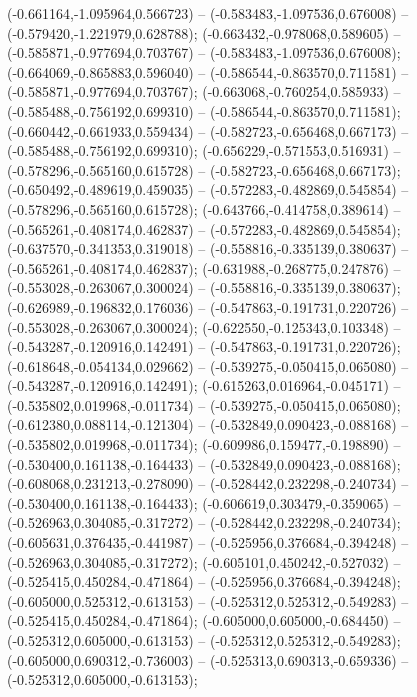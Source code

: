  (-0.661164,-1.095964,0.566723) -- (-0.583483,-1.097536,0.676008) -- (-0.579420,-1.221979,0.628788);
 (-0.663432,-0.978068,0.589605) -- (-0.585871,-0.977694,0.703767) -- (-0.583483,-1.097536,0.676008);
 (-0.664069,-0.865883,0.596040) -- (-0.586544,-0.863570,0.711581) -- (-0.585871,-0.977694,0.703767);
 (-0.663068,-0.760254,0.585933) -- (-0.585488,-0.756192,0.699310) -- (-0.586544,-0.863570,0.711581);
 (-0.660442,-0.661933,0.559434) -- (-0.582723,-0.656468,0.667173) -- (-0.585488,-0.756192,0.699310);
 (-0.656229,-0.571553,0.516931) -- (-0.578296,-0.565160,0.615728) -- (-0.582723,-0.656468,0.667173);
 (-0.650492,-0.489619,0.459035) -- (-0.572283,-0.482869,0.545854) -- (-0.578296,-0.565160,0.615728);
 (-0.643766,-0.414758,0.389614) -- (-0.565261,-0.408174,0.462837) -- (-0.572283,-0.482869,0.545854);
 (-0.637570,-0.341353,0.319018) -- (-0.558816,-0.335139,0.380637) -- (-0.565261,-0.408174,0.462837);
 (-0.631988,-0.268775,0.247876) -- (-0.553028,-0.263067,0.300024) -- (-0.558816,-0.335139,0.380637);
 (-0.626989,-0.196832,0.176036) -- (-0.547863,-0.191731,0.220726) -- (-0.553028,-0.263067,0.300024);
 (-0.622550,-0.125343,0.103348) -- (-0.543287,-0.120916,0.142491) -- (-0.547863,-0.191731,0.220726);
 (-0.618648,-0.054134,0.029662) -- (-0.539275,-0.050415,0.065080) -- (-0.543287,-0.120916,0.142491);
 (-0.615263,0.016964,-0.045171) -- (-0.535802,0.019968,-0.011734) -- (-0.539275,-0.050415,0.065080);
 (-0.612380,0.088114,-0.121304) -- (-0.532849,0.090423,-0.088168) -- (-0.535802,0.019968,-0.011734);
 (-0.609986,0.159477,-0.198890) -- (-0.530400,0.161138,-0.164433) -- (-0.532849,0.090423,-0.088168);
 (-0.608068,0.231213,-0.278090) -- (-0.528442,0.232298,-0.240734) -- (-0.530400,0.161138,-0.164433);
 (-0.606619,0.303479,-0.359065) -- (-0.526963,0.304085,-0.317272) -- (-0.528442,0.232298,-0.240734);
 (-0.605631,0.376435,-0.441987) -- (-0.525956,0.376684,-0.394248) -- (-0.526963,0.304085,-0.317272);
 (-0.605101,0.450242,-0.527032) -- (-0.525415,0.450284,-0.471864) -- (-0.525956,0.376684,-0.394248);
 (-0.605000,0.525312,-0.613153) -- (-0.525312,0.525312,-0.549283) -- (-0.525415,0.450284,-0.471864);
 (-0.605000,0.605000,-0.684450) -- (-0.525312,0.605000,-0.613153) -- (-0.525312,0.525312,-0.549283);
 (-0.605000,0.690312,-0.736003) -- (-0.525313,0.690313,-0.659336) -- (-0.525312,0.605000,-0.613153);
